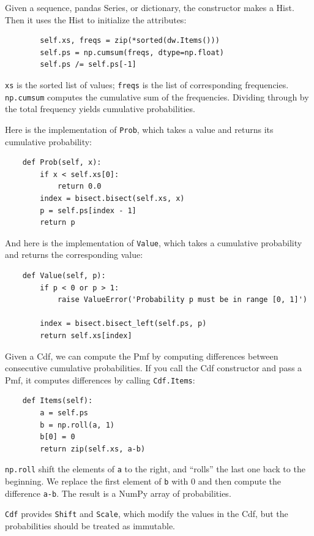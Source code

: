 \documentclass[12pt]{book}
\begin{document}
Given a sequence, pandas Series, or dictionary, the constructor makes
a Hist.  Then it uses the Hist to initialize the attributes:

\begin{verbatim}
        self.xs, freqs = zip(*sorted(dw.Items()))
        self.ps = np.cumsum(freqs, dtype=np.float)
        self.ps /= self.ps[-1]
\end{verbatim}

{\tt xs} is the sorted list of values; {\tt freqs} is the list
of corresponding frequencies.  {\tt np.cumsum} computes
the cumulative sum of the frequencies.  Dividing through by the
total frequency yields cumulative probabilities.

Here is the implementation of {\tt Prob}, which takes a value
and returns its cumulative probability: 

\begin{verbatim}
    def Prob(self, x):
        if x < self.xs[0]:
            return 0.0
        index = bisect.bisect(self.xs, x)
        p = self.ps[index - 1]
        return p
\end{verbatim}

And here is the implementation of {\tt Value}, which takes a cumulative
probability and returns the corresponding value:

\begin{verbatim}
    def Value(self, p):
        if p < 0 or p > 1:
            raise ValueError('Probability p must be in range [0, 1]')

        index = bisect.bisect_left(self.ps, p)
        return self.xs[index]
\end{verbatim}

Given a Cdf, we can compute the Pmf by computing differences between
consecutive cumulative probabilities.  If you call the Cdf constructor
and pass a Pmf, it computes differences by calling {\tt Cdf.Items}:

\begin{verbatim}
    def Items(self):
        a = self.ps
        b = np.roll(a, 1)
        b[0] = 0
        return zip(self.xs, a-b)
\end{verbatim}

{\tt np.roll} shift the elements of {\tt a} to the right, and ``rolls''
the last one back to the beginning.  We replace the first element of
{\tt b} with 0 and then compute the difference {\tt a-b}.  The result
is a NumPy array of probabilities.

{\tt Cdf} provides {\tt Shift} and {\tt Scale}, which modify the
values in the Cdf, but the probabilities should be treated as
immutable.
\end{document}
